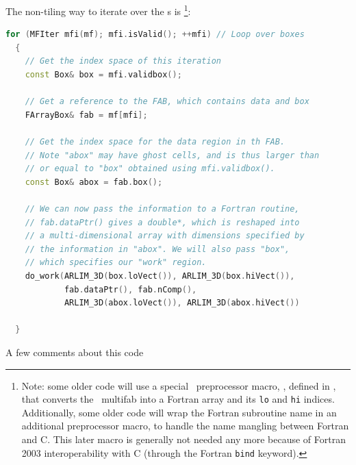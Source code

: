 The non-tiling way to iterate over the \farraybox s is
\footnote{Note: some older code will use a special \boxlib\ preprocessor macro,
, defined in , that converts
the \cpp\ multifab into a Fortran array and its {\tt lo} and {\tt hi} indices.
Additionally, some older code will wrap the Fortran subroutine name
in an additional preprocessor macro, 
to handle the name mangling between Fortran and C.  This later
macro is generally not needed any more because of Fortran 2003
interoperability with C (through the Fortran {\tt bind} keyword).
}:
\begin{lstlisting}[language=C++]
  for (MFIter mfi(mf); mfi.isValid(); ++mfi) // Loop over boxes
  {
    // Get the index space of this iteration
    const Box& box = mfi.validbox();

    // Get a reference to the FAB, which contains data and box
    FArrayBox& fab = mf[mfi];

    // Get the index space for the data region in th FAB.
    // Note "abox" may have ghost cells, and is thus larger than
    // or equal to "box" obtained using mfi.validbox().
    const Box& abox = fab.box();

    // We can now pass the information to a Fortran routine,
    // fab.dataPtr() gives a double*, which is reshaped into
    // a multi-dimensional array with dimensions specified by
    // the information in "abox". We will also pass "box",
    // which specifies our "work" region.
    do_work(ARLIM_3D(box.loVect()), ARLIM_3D(box.hiVect()),
            fab.dataPtr(), fab.nComp(),
            ARLIM_3D(abox.loVect()), ARLIM_3D(abox.hiVect())

  }
\end{lstlisting}
A few comments about this code
